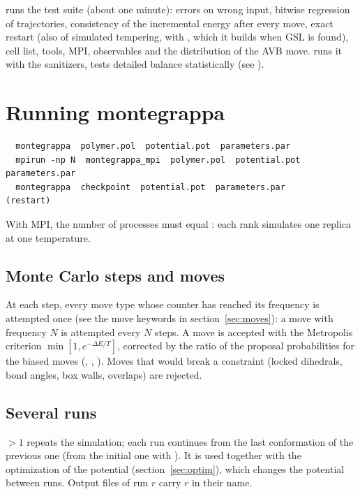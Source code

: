 \documentclass[11pt,a4paper]{article}
\begin{document}
 runs the test suite (about one minute): errors on wrong
input, bitwise regression of trajectories, consistency of the incremental
energy after every move, exact restart (also of simulated tempering, with
, which it builds when GSL is found), cell list,
tools, MPI, observables and the distribution of the AVB move.  runs it with the
sanitizers,  tests detailed balance statistically (see
).

\section{Running montegrappa}

\begin{Verbatim}
  montegrappa  polymer.pol  potential.pot  parameters.par
  mpirun -np N  montegrappa_mpi  polymer.pol  potential.pot  parameters.par
  montegrappa  checkpoint  potential.pot  parameters.par      (restart)
\end{Verbatim}
With MPI, the number of processes must equal : each rank
simulates one replica at one temperature.

\subsection{Monte Carlo steps and moves}
At each step, every move type whose counter has reached its frequency is
attempted once (see the move keywords in section~\ref{sec:moves}): a move
with frequency $N$ is attempted every $N$ steps. A move is accepted with the
Metropolis criterion $\min[1, e^{-\Delta E/T}]$, corrected by the ratio of
the proposal probabilities for the biased moves (, ,
). Moves that would break a constraint (locked dihedrals, bond
angles, box walls, overlaps) are rejected.

\subsection{Several runs}
 $>1$ repeats the simulation; each run continues from the last
conformation of the previous one (from the initial one with
). It is used together with the optimization of the
potential (section~\ref{sec:optim}), which changes the potential between
runs. Output files of run $r$ carry $r$ in their name.
\end{document}
